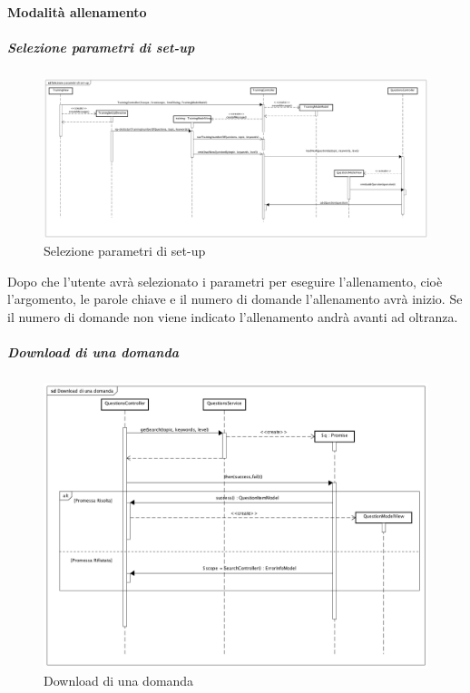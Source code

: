 \paragraph{Modalità allenamento}

\subparagraph{Selezione parametri di set-up}

\label{Selezione parametri di set-up}

\begin{figure}[ht]
	\centering
	\includegraphics[scale=0.25,keepaspectratio]{UML/DiagrammiDiSequenza/Front-end/Training_setUp.png}
	\caption{Selezione parametri di set-up}
\end{figure} \FloatBarrier

Dopo che l'utente avrà selezionato i parametri per eseguire l'allenamento, cioè l'argomento, le parole chiave e il numero di domande l'allenamento avrà inizio. Se il numero di domande non viene indicato l'allenamento andrà avanti ad oltranza.

\subparagraph{Download di una domanda}

\label{Download di una domanda}

\begin{figure}[ht]
	\centering
	\includegraphics[scale=0.35,keepaspectratio]{UML/DiagrammiDiSequenza/Front-end/Training_downloadAquestion.png}
	\caption{Download di una domanda}
\end{figure} \FloatBarrier

